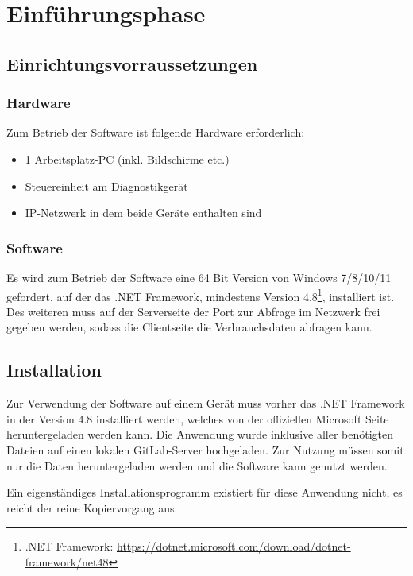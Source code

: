 \section{Einführungsphase}
\label{sec:Einfuehrungsphase}

\subsection{Einrichtungsvorraussetzungen}
\label{sec:Einrichtungsvorraussetzungen}

\subsubsection{Hardware}
\label{sec:HardwareEinrichtung}
Zum Betrieb der Software ist folgende Hardware erforderlich:

\begin{itemize}
	\item 1 Arbeitsplatz-PC (inkl. Bildschirme etc.)
	\item Steuereinheit am Diagnostikgerät
	\item IP-Netzwerk in dem beide Geräte enthalten sind
\end{itemize}

\subsubsection{Software}
\label{sec:SoftwareEinrichtung}
Es wird zum Betrieb der Software eine 64 Bit Version von Windows 7/8/10/11 gefordert, auf der das .NET Framework, mindestens Version 4.8\footnote{.NET Framework: \url{https://dotnet.microsoft.com/download/dotnet-framework/net48}}, installiert ist. Des weiteren muss auf der Serverseite der Port zur Abfrage im Netzwerk frei gegeben werden, sodass die Clientseite die Verbrauchsdaten abfragen kann.

\subsection{Installation}
\label{sec:Installation}
Zur Verwendung der Software auf einem Gerät muss vorher das .NET Framework in der Version 4.8 installiert werden, welches von der offiziellen Microsoft Seite heruntergeladen werden kann. Die Anwendung wurde inklusive aller benötigten Dateien auf einen lokalen {\acs{GitLab}}-Server hochgeladen. Zur Nutzung müssen somit nur die Daten heruntergeladen werden und die Software kann genutzt werden.

Ein eigenständiges Installationsprogramm existiert für diese Anwendung nicht, es reicht der reine Kopiervorgang aus.